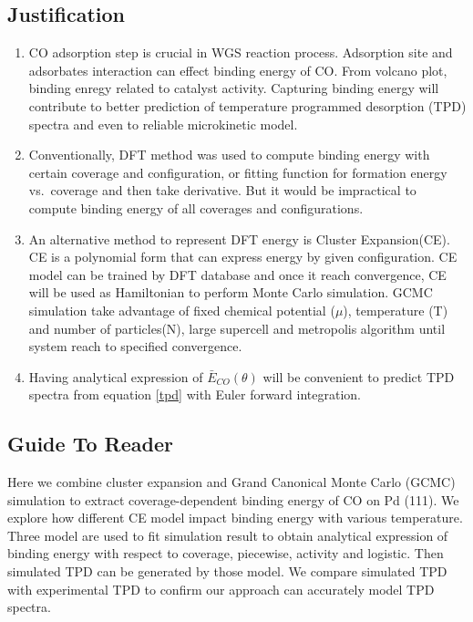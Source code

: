 \documentclass[11pt]{article}
\begin{document}
\subsection*{Justification}
\label{jus}
\begin{enumerate}
\item CO adsorption step is crucial in WGS reaction process. Adsorption site and adsorbates interaction can effect binding energy of CO. From volcano plot, binding enregy related to catalyst activity. Capturing binding energy will contribute to better prediction of temperature programmed desorption (TPD) spectra and even to reliable microkinetic model.

\item Conventionally, DFT method was used to compute binding energy with certain coverage and configuration, or fitting function for formation energy vs.\ coverage and then take derivative. But it would be impractical to compute binding energy of all coverages and configurations.

\item An alternative method to represent DFT energy is Cluster Expansion(CE). CE is a polynomial form that can express energy by given configuration. CE model can be trained by DFT database and once it reach convergence, CE will be used as Hamiltonian to perform Monte Carlo simulation. GCMC simulation take advantage of fixed chemical potential (${\mu}$), temperature (T) and number of particles(N), large supercell and metropolis algorithm until system reach to specified convergence.

\item Having analytical expression of $\bar{E}_{CO}(\theta)$ will be convenient to predict TPD spectra from equation \ref{tpd} with Euler forward integration.
\end{enumerate}

\subsection*{Guide To Reader}
\label{guide}

Here we combine cluster expansion and Grand Canonical Monte Carlo (GCMC) simulation to extract coverage-dependent binding energy of CO on Pd (111). We explore how different CE model impact binding energy with various temperature. Three model are used to fit simulation result to obtain analytical expression of binding energy with respect to coverage, piecewise\cite{Grabow2010}, activity \cite{Bajpai2020} and logistic\cite{Grabow2008}. Then simulated TPD can be generated by those model. We compare simulated TPD with experimental TPD \cite{Guo1989} to confirm our approach can accurately model TPD spectra.
\end{document}
